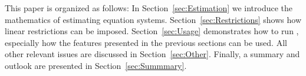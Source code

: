 This paper is organized as follows: In Section~\ref{sec:Estimation} we
introduce the mathematics of estimating equation systems.
Section~\ref{sec:Restrictions} shows how linear restrictions can be
imposed.  Section~\ref{sec:Usage} demonstrates how to run
, especially how the features presented in the previous
sections can be used.  All other relevant issues are discussed in
Section~\ref{sec:Other}.  Finally, a summary and outlook are presented
in Section~\ref{sec:Summmary}.


